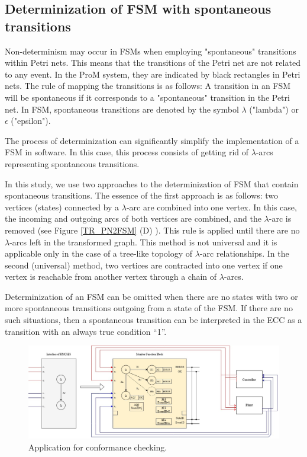 \documentclass{ieeeojies}
\begin{document}
\subsection{Determinization of FSM with spontaneous transitions}

Non-determinism may occur in FSMs when employing "spontaneous" transitions within Petri nets. This means that the transitions of the Petri net are not related to any event. In the ProM system, they are indicated by black rectangles in Petri nets. The rule of mapping the transitions is as follows: A transition in an FSM  will be spontaneous if it corresponds to a "spontaneous" transition in the Petri net. In FSM, spontaneous transitions are denoted by the symbol $\lambda$  ("lambda")  or  $\epsilon$ ("epsilon").

The process of determinization can significantly simplify the implementation of a FSM in software. In this case, this process consists of getting rid of $\lambda$-arcs representing spontaneous transitions.


In this study, we use two approaches to the determinization of FSM that contain spontaneous transitions. The essence of the first approach is as follows: two vertices (states) connected by a $\lambda$-arc are combined into one vertex. In this case, the incoming and outgoing arcs of both vertices are combined, and the $\lambda$-arc is removed (see Figure \ref{TR_PN2FSM} (D) ). This rule is applied until there are no $\lambda$-arcs left in the transformed graph. This method is not universal and it is applicable only in the case of a tree-like topology of $\lambda$-arc relationships. In the second (universal) method, two vertices are contracted into one vertex if one vertex is reachable from another vertex through a chain of $\lambda$-arcs.


Determinization of an FSM can be omitted when there are no states with two or more spontaneous transitions outgoing from a state of the FSM. If there are no such situations, then a spontaneous transition can be interpreted in the ECC as a transition with an always true condition “1”.


\begin{figure}[!t]
	\centering
	\includegraphics[width=1\textwidth]{images/ConformaceCheckingApp.jpg}
	\caption{Application for conformance checking.}
	\label{conformanceCheckingApp}

\end{figure}
\end{document}
